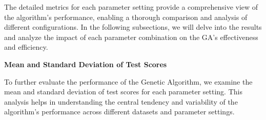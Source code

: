 \documentclass[
]{article}
\begin{document}
    The detailed metrics for each parameter setting provide a comprehensive view of the algorithm's performance, enabling a thorough comparison and analysis of different configurations. In the following subsections, we will delve into the results and analyze the impact of each parameter combination on the GA's effectiveness and efficiency.

    \textbf{Mean and Standard Deviation of Test Scores}

    To further evaluate the performance of the Genetic Algorithm, we examine the mean and standard deviation of test scores for each parameter setting. This analysis helps in understanding the central tendency and variability of the algorithm's performance across different datasets and parameter settings.

    \begin{table}[H]
        \centering
\end{table}
\end{document}
